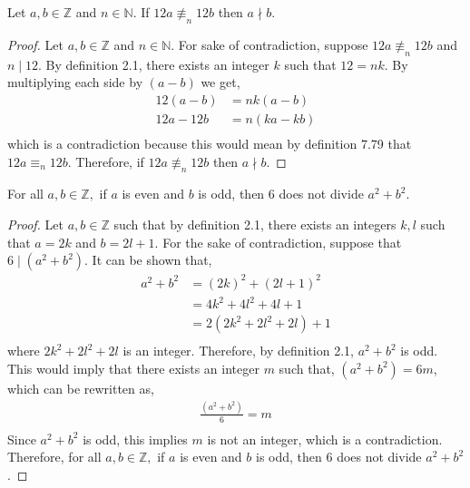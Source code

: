 \documentclass[12pt]{article}
\newenvironment{theorem}[2][Theorem]{\begin{trivlist}
\item[\hskip \labelsep {\bfseries #1}\hskip \labelsep {\bfseries #2.}]}{\end{trivlist}}
\begin{document}
\section{}
\begin{theorem}{7} 
	Let $a,b \in \mathbb{Z}$ and $n \in \mathbb{N}$. If $12a \not\equiv_n 12b$ then $a \nmid b$.
\end{theorem}
	\begin{proof}
		Let $a,b \in \mathbb{Z}$ and $n \in \mathbb{N}$. For sake of contradiction,
		suppose $12a \not\equiv_n 12b$ and $n\mid12$. By definition 2.1, there exists an integer $k$ such that
		$12=nk$. By multiplying each side by $(a-b)$ we get,
		\begin{align*}
			12(a-b) &= nk(a-b)\\
			12a-12b &= n(ka-kb)\\
		\end{align*}
		which is a contradiction because this would mean by definition 7.79 that
		$12a \equiv_n 12b$. Therefore, if $12a \not\equiv_n 12b$ then $a \nmid b$.
\end{proof}
\begin{theorem}{8} 
	For all $a,b \in \mathbb{Z},$ if $a$ is even and $b$ is odd, then 6 does not 
	divide $a^2+b^2$.
\end{theorem}
	\begin{proof}
		Let $a,b \in \mathbb{Z}$ such that by definition 2.1, there exists an integers $k,l$ such that $a=2k$ and $b=2l+1$.
		For the sake of contradiction, suppose that $6\mid(a^2+b^2)$. It can be shown that, 
		\begin{align*}
			a^2+b^2&=(2k)^2+(2l+1)^2\\
			       &=4k^2+4l^2+4l+1\\
				      &=2(2k^2+2l^2+2l)+1\\
		\end{align*}
		where $2k^2+2l^2+2l$ is an integer. 
		Therefore, by definition 2.1, $a^2+b^2$ is odd. 
		This would imply that there exists an integer $m$ such that,
		$(a^2+b^2)=6m$, which can be rewritten as,
		\begin{align*}
			\frac{(a^2+b^2)}{6} = m\\ 
		\end{align*}
		Since $a^2+b^2$ is odd, this implies $m$ is not an integer, which is a contradiction.
		Therefore, for all $a,b \in \mathbb{Z},$ if $a$ is even and $b$ is odd, then 6 does not
		divide $a^2+b^2$.
		

\end{proof}
		
\end{document}
